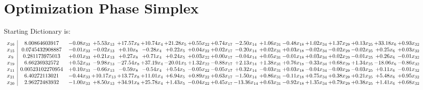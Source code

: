 \documentclass[9pt]{article}
\begin{document}
\section{Optimization Phase Simplex}
Starting Dictionary is:
\[\begin{array}{c| c c@{\hskip 2pt} c@{\hskip 2pt} c@{\hskip 2pt} c@{\hskip 2pt} c@{\hskip 2pt} c@{\hskip 2pt} c@{\hskip 2pt} c@{\hskip 2pt} c@{\hskip 2pt} c@{\hskip 2pt} c@{\hskip 2pt} c@{\hskip 2pt} c@{\hskip 2pt} c@{\hskip 2pt} c@{\hskip 2pt} }
 x_{16}   &  8.00864603917 & -0.08 x_{33} & +  5.53 x_{13} & + 17.57 x_{8} & + 10.74 x_{4} & + 21.28 x_{5} & +  0.55 x_{22} & +  0.74 x_{17} & -2.50 x_{14} & +  1.06 x_{31} & -0.48 x_{18} & +  1.02 x_{34} & +  1.37 x_{29} & +  0.13 x_{25} & + 33.18 x_{6} & +  0.93 x_{32}\\
 x_{15}   &  0.0745432908887 & -0.01 x_{33} & -0.02 x_{13} & +  0.10 x_{8} & -0.28 x_{4} & +  0.22 x_{5} & +  0.04 x_{22} & +  0.02 x_{17} & -0.20 x_{14} & +  0.02 x_{31} & +  0.03 x_{18} & -0.02 x_{34} & -0.02 x_{29} & -0.02 x_{25} & +  0.25 x_{6} & +  0.03 x_{32}\\
 x_{9}   &  0.281173975013 & +  0.01 x_{33} & +  0.21 x_{13} & +  0.27 x_{8} & +  0.71 x_{4} & +  0.24 x_{5} & +  0.03 x_{22} & +  0.00 x_{17} & -0.04 x_{14} & +  0.05 x_{31} & -0.01 x_{18} & +  0.03 x_{34} & +  0.02 x_{29} & -0.01 x_{25} & +  0.26 x_{6} & -0.01 x_{32}\\
 x_{19}   &  6.66236932572 & +  0.52 x_{33} & -9.98 x_{13} & -27.54 x_{8} & + 37.19 x_{4} & -20.01 x_{5} & +  1.32 x_{22} & -0.88 x_{17} & +  2.13 x_{14} & +  1.38 x_{31} & +  0.76 x_{18} & -0.33 x_{34} & +  0.68 x_{29} & +  1.34 x_{25} & -18.06 x_{6} & -0.86 x_{32}\\
 x_{11}   &  0.00523102270954 & +  0.10 x_{33} & -0.66 x_{13} & -0.59 x_{8} & -0.54 x_{4} & +  0.54 x_{5} & -0.05 x_{22} & -0.05 x_{17} & +  0.32 x_{14} & -0.03 x_{31} & +  0.03 x_{18} & -0.04 x_{34} & -0.00 x_{29} & -0.03 x_{25} & +  0.11 x_{6} & -0.01 x_{32}\\
 x_{21}   &  6.40272113021 & -0.44 x_{33} & + 10.17 x_{13} & + 13.77 x_{8} & + 11.01 x_{4} & +  6.94 x_{5} & +  0.89 x_{22} & +  0.63 x_{17} & -1.50 x_{14} & +  0.86 x_{31} & -0.11 x_{18} & +  0.75 x_{34} & +  0.38 x_{29} & +  0.21 x_{25} & +  5.48 x_{6} & +  0.95 x_{32}\\
 x_{30}   &  2.96272483932 & -1.00 x_{33} & +  8.50 x_{13} & + 34.91 x_{8} & + 25.78 x_{4} & +  1.43 x_{5} & -0.04 x_{22} & +  0.45 x_{17} & -13.36 x_{14} & +  0.63 x_{31} & -0.92 x_{18} & +  1.35 x_{34} & +  0.79 x_{29} & +  0.38 x_{25} & +  1.41 x_{6} & +  0.68 x_{32}\\

\end{array}\]
\end{document}
